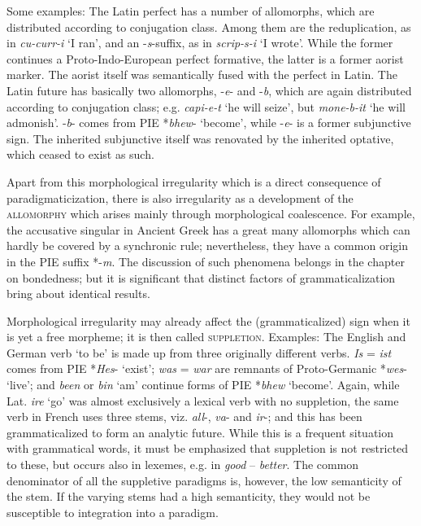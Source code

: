 Some examples: The Latin perfect has a number of allomorphs, which are distributed according to conjugation class. Among them are the reduplication, as in \textit{cu-curr-i} ‘I ran’, and an -\textit{s}{}-suffix, as in \textit{scrip-s-i} ‘I wrote’. While the former continues a Proto-Indo-European perfect formative, the latter is a former aorist marker. The aorist itself was semantically fused with the perfect in Latin. The Latin future has basically two allomorphs, -\textit{e}{}- and -\textit{b}, which are again distributed according to conjugation class; e.g. \textit{capi-e-t} ‘he will seize’, but \textit{mone-b-it} ‘he will admonish’. -\textit{b}{}- comes from PIE *\textit{bhew}{}- ‘become’, while -\textit{e}{}- is a former subjunctive sign. The inherited subjunctive itself was renovated by the inherited optative, which ceased to exist as such.

Apart from this morphological irregularity which is a direct consequence of paradigmaticization, there is also irregularity as a development of the \textsc{allomorphy} which arises mainly through morphological coalescence. For example, the accusative singular in Ancient Greek has a great many allomorphs which can hardly be covered by a synchronic rule; nevertheless, they have a common origin in the PIE suffix *-\textit{m}. The discussion of such phenomena belongs in the chapter on bondedness; but it is significant that distinct factors of grammaticalization bring about identical results.

Morphological irregularity may already affect the (grammaticalized) sign when it is yet a free morpheme; it is then called \textsc{suppletion}. Examples: The English and German verb ‘to be’ is made up from three originally different verbs. \textit{Is} = \textit{ist} comes from PIE *\textit{Hes}{}- `exist'; \textit{was} = \textit{war} are remnants of Proto-Germanic *\textit{wes}{}- ‘live’; and \textit{been} or \textit{bin} ‘am’ continue forms of PIE *\textit{bhew} ‘become’. Again, while Lat. \textit{ire} ‘go’ was almost exclusively a lexical verb with no suppletion, the same verb in French uses three stems, viz. \textit{all}{}-, \textit{va}{}- and \textit{ir}{}-; and this has been grammaticalized to form an analytic future. While this is a frequent situation with grammatical words, it must be emphasized that suppletion is not restricted to these, but occurs also in lexemes, e.g. in \textit{good} -- \textit{better}. The common denominator of all the suppletive paradigms is, however, the low semanticity of the stem. If the varying stems had a high semanticity, they would not be susceptible to integration into a paradigm.

